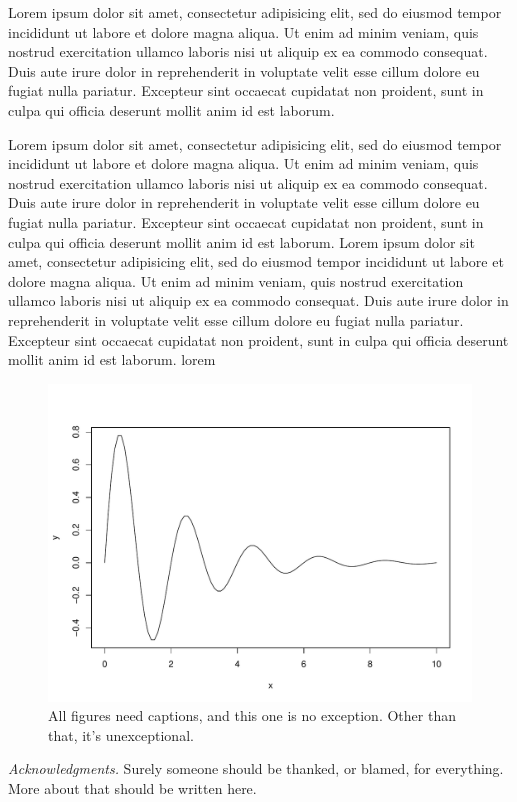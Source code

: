 \documentclass[12pt,titlepage]{article}
\begin{document}
Lorem ipsum dolor sit amet, consectetur adipisicing elit, sed do eiusmod tempor
incididunt ut labore et dolore magna aliqua. Ut enim ad minim veniam, quis nostrud
exercitation ullamco laboris nisi ut aliquip ex ea commodo consequat. Duis aute irure
dolor in reprehenderit in voluptate velit esse cillum dolore eu fugiat nulla pariatur.
Excepteur sint occaecat cupidatat non proident, sunt in culpa qui officia deserunt
mollit anim id est laborum.


Lorem ipsum dolor sit amet, consectetur adipisicing elit, sed do eiusmod tempor
incididunt ut labore et dolore magna aliqua. Ut enim ad minim veniam, quis nostrud
exercitation ullamco laboris nisi ut aliquip ex ea commodo consequat. Duis aute irure
dolor in reprehenderit in voluptate velit esse cillum dolore eu fugiat nulla pariatur.
Excepteur sint occaecat cupidatat non proident, sunt in culpa qui officia deserunt
mollit anim id est laborum. Lorem ipsum dolor sit amet, consectetur adipisicing elit,
sed do eiusmod tempor incididunt ut labore et dolore magna aliqua. Ut enim ad minim
veniam, quis nostrud exercitation ullamco laboris nisi ut aliquip ex ea commodo
consequat. Duis aute irure dolor in reprehenderit in voluptate velit esse cillum
dolore eu fugiat nulla pariatur. Excepteur sint occaecat cupidatat non proident, sunt
in culpa qui officia deserunt mollit anim id est laborum. lorem





\begin{figure}
  \centering\includegraphics[width=\hsize]{figure1}
  \caption{All figures need captions, and this one is no exception.
    Other than that, it's unexceptional.\label{figure1}}
\end{figure}

 
\bigskip
\emph{Acknowledgments.}
Surely someone should be thanked, or blamed, for everything.  More about that should be written here.



\end{document}
